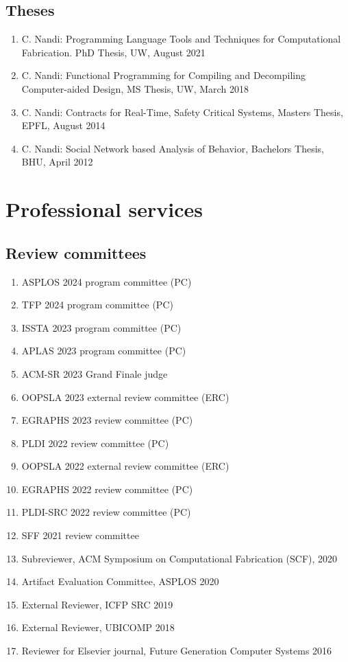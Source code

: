 \documentclass[margin, 10pt]{res} %
\begin{document}
\begin{resume}
\subsection{Theses}
\begin{enumerate}
\item C. Nandi: Programming Language Tools and Techniques for Computational Fabrication. {PhD Thesis}, UW, August 2021
\item C. Nandi: Functional Programming for Compiling and Decompiling Computer-aided Design, {MS Thesis}, UW, March 2018
\item C. Nandi: Contracts for Real-Time, Safety Critical Systems, {Masters Thesis}, EPFL, August 2014
\item C. Nandi: Social Network based Analysis of Behavior, {Bachelors Thesis}, BHU, April 2012
\end{enumerate}

\section{Professional services}


\subsection{Review committees}

\begin{enumerate}[itemsep=-2pt]
\item ASPLOS 2024 program committee (PC)
\item TFP 2024 program committee (PC)
\item ISSTA 2023 program committee (PC)
\item APLAS 2023 program committee (PC)
\item ACM-SR 2023 Grand Finale judge
\item OOPSLA 2023 external review committee (ERC)
\item EGRAPHS 2023 review committee (PC)
\item PLDI 2022 review committee (PC)
\item OOPSLA 2022 external review committee (ERC)
\item EGRAPHS 2022 review committee (PC)
\item PLDI-SRC 2022 review committee (PC)
\item SFF 2021 review committee
\item Subreviewer, ACM Symposium on Computational Fabrication (SCF), 2020
\item Artifact Evaluation Committee, ASPLOS 2020
\item External Reviewer, ICFP SRC 2019
\item External Reviewer, UBICOMP 2018
\item Reviewer for Elsevier journal, Future Generation Computer Systems 2016
\end{enumerate}


\end{resume}
\end{document}
